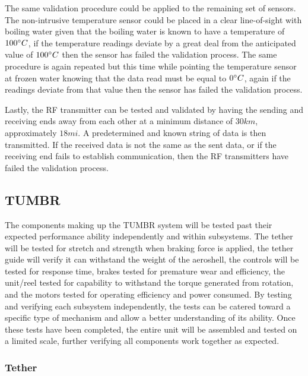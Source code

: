 The same validation procedure could be applied to the remaining set of sensors. The non-intrusive temperature sensor could be placed in a clear line-of-sight with boiling water given that the boiling water is known to have a temperature of $100\degree C$, if the temperature readings deviate by a great deal from the anticipated value of $100\degree C$ then the sensor has failed the validation process. The same procedure is again repeated but this time while pointing the temperature sensor at frozen water knowing that the data read must be equal to $0\degree C$, again if the readings deviate from that value then the sensor has failed the validation process.

Lastly, the RF transmitter can be tested and validated by having the sending and receiving ends away from each other at a minimum distance of $30km$, approximately $18mi$. A predetermined and known string of data is then transmitted. If the received data is not the same as the sent data, or if the receiving end fails to establish communication, then the RF transmitters have failed the validation process.


\subsection{TUMBR}

\indent\indent The components making up the TUMBR system will be tested past their expected performance ability independently and within subsystems. The tether will be tested for stretch and strength when braking force is applied, the tether guide will verify it can withstand the weight of the aeroshell, the controls will be tested for response time, brakes tested for premature wear and efficiency, the unit/reel tested for capability to withstand the torque generated from rotation, and the motors tested for operating efficiency and power consumed. By testing and verifying each subsystem independently, the tests can be catered toward a specific type of mechanism and allow a better understanding of its ability. Once these tests have been completed, the entire unit will be assembled and tested on a limited scale, further verifying all components work together as expected.


\subsubsection{Tether}


